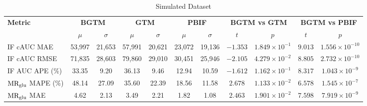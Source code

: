 \begin{sidewaystable}[b]
	\centering
	\small
	\setlength{\tabcolsep}{10pt}
	\caption*{Simulated Dataset}
	\begin{tabular}{l|cc|cc|cc|cc|cc}
		\toprule
		\multirow{2}{*}{\textbf{Metric}} & \multicolumn{2}{c|}{\textbf{BGTM}} & \multicolumn{2}{c|}{\textbf{GTM}} & \multicolumn{2}{c|}{\textbf{PBIF}} & \multicolumn{2}{c|}{\textbf{BGTM vs GTM}} & \multicolumn{2}{c}{\textbf{BGTM vs PBIF}}                                                                                                 \\
		\cmidrule(lr){2-3} \cmidrule(lr){4-5} \cmidrule(lr){6-7} \cmidrule(lr){8-9} \cmidrule(lr){10-11}
		                                 & \(\mu\)                            & \(\sigma\)                        & \(\mu\)                            & \(\sigma\)                                & \(\mu\)                                   & \(\sigma\) & \(t\)      & \(p\)                         & \(t\)     & \(p\)                   \\
		\midrule
		IF cAUC MAE                      & 53{,}997                           & 21{,}653                          & 57{,}991                           & 20{,}621                                  & 23{,}072                                  & 19{,}136   & \(-1.353\) & \(1.849\times10^{-1}\)        & \(9.013\) & \(1.556\times10^{-10}\) \\
		IF cAUC RMSE                     & 71{,}835                           & 28{,}603                          & 79{,}860                           & 29{,}010                                  & 30{,}451                                  & 25{,}946   & \(-2.105\) & \(4.279\times10^{-2}\)\sym{*} & \(8.805\) & \(2.732\times10^{-10}\) \\
		IF AUC APE (\%)                  & 33.35                              & 9.20                              & 36.13                              & 9.46                                      & 12.94                                     & 10.59      & \(-1.612\) & \(1.162\times10^{-1}\)        & \(8.317\) & \(1.043\times10^{-9}\)  \\
		\midrule
		\(\text{MR}_{\text{glu}}\) MAPE (\%)             & 48.14                              & 27.09                             & 35.60                              & 22.39                                     & 18.56                                     & 11.58      & \(2.678\)  & \(1.133\times10^{-2}\)        & \(6.578\) & \(1.545\times10^{-7}\)  \\
		\(\text{MR}_{\text{glu}}\) MAE                   & 4.62                               & 2.13                              & 3.49                               & 2.21                                      & 1.82                                      & 1.08       & \(2.463\)  & \(1.901\times10^{-2}\)        & \(7.598\) & \(7.919\times10^{-9}\)  \\

\end{tabular}
\end{sidewaystable}
